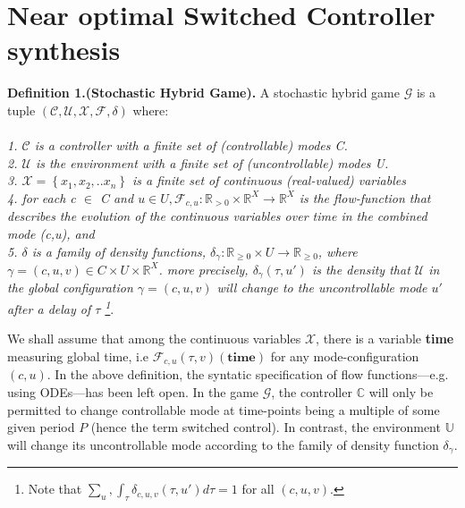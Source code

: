 
    \clearpage




\section{Near optimal Switched Controller synthesis}
    \textbf{Definition 1.(Stochastic Hybrid Game).} A stochastic hybrid game $\mathcal{G}$ is a
    tuple $(\mathcal{C,U,X,F},\delta)$ where:
    \\
    \\
    \emph{1. $\mathcal{C}$ is a controller with a finite set of (controllable) modes C.} \\
    \emph{2. $\mathcal{U}$ is the environment with a finite set of (uncontrollable) modes U.} \\
    \emph{3. $\mathcal{X} = \left\lbrace x_1,x_2,..x_n \right\rbrace$ is a finite set of
    continuous (real-valued) variables } \\
    \emph{4. for each c $\in$ C and $u \in U, \mathcal{F}_{c,u} : \mathbb{R}_{>0}
     \times \mathbb{R}^X \rightarrow\mathbb{R}^X$ 
        is the flow-function that describes the evolution of the continuous variables
        over time in the combined mode (c,u), and} \\
    \emph{5. $\delta$ is a family of density functions, $\delta_\gamma: 
    \mathbb{R}_{\geqslant 0} \times U \rightarrow 
    \mathbb{R}_{\geqslant 0}$, where $ \gamma = (c,u,v) \in C \times U
    \times \mathbb{R}^X$.
    more precisely, $\delta_{\gamma}(\tau,u')$ is the density that $\mathcal{U}$
    in the global configuration $ \gamma = (c,u,v)$ will change to the
     uncontrollable mode $u'$ after a delay of $\tau$ 
     \footnote{Note that $\sum_u,\int_{\tau}\delta_{c,u,v}(\tau,u')d\tau = 1$ for all $(c,u,v)$.}}.

    We shall assume that among the continuous variables $\mathcal{X}$, there is a variable
    \textbf{time} measuring global time, i.e $\mathcal{F}_{c,u}(\tau,v)(\textbf{time})$ 
    for any mode-configuration $(c,u)$. In the above definition, the syntatic specification
    of flow functions---e.g. using ODEs---has been left open. In the game $\mathcal{G}$,
    the controller $\mathbb{C}$ will only be permitted to change controllable mode at time-points
    being a multiple of some given period $P$ (hence the term switched control). In contrast,
    the environment $\mathbb{U}$ will change its uncontrollable mode according to the 
    family of density function $\delta_\gamma$.
    
